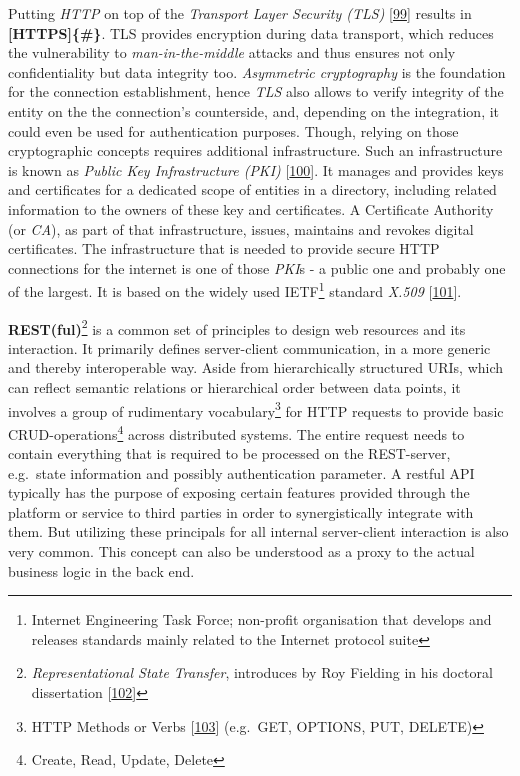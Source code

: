 \documentclass[12pt,english,a4paper,titlepage,cleardoublepage=empty,dottedtoc]{report}
\begin{document}
Putting \emph{HTTP} on top of the \emph{Transport Layer Security (TLS)}
{[}\protect\hyperlink{ref-web_spec_tls}{99}{]} results in
\textbf{{[}HTTPS{]}\{\#\}}. TLS provides encryption during data
transport, which reduces the vulnerability to \emph{man-in-the-middle}
attacks and thus ensures not only confidentiality but data integrity
too. \emph{Asymmetric cryptography} is the foundation for the connection
establishment, hence \emph{TLS} also allows to verify integrity of the
entity on the the connection's counterside, and, depending on the
integration, it could even be used for authentication purposes. Though,
relying on those cryptographic concepts requires additional
infrastructure. Such an infrastructure is known as \emph{Public Key
Infrastructure (PKI)}
{[}\protect\hyperlink{ref-book_2014_chapter-14-5-pki}{100}{]}. It
manages and provides keys and certificates for a dedicated scope of
entities in a directory, including related information to the owners of
these key and certificates. A Certificate Authority (or \emph{CA}), as
part of that infrastructure, issues, maintains and revokes digital
certificates. The infrastructure that is needed to provide secure HTTP
connections for the internet is one of those \emph{PKI}s - a public one
and probably one of the largest. It is based on the widely used
IETF\footnote{Internet Engineering Task Force; non-profit organisation
  that develops and releases standards mainly related to the Internet
  protocol suite} standard \emph{X.509}
{[}\protect\hyperlink{ref-web_spec_x509}{101}{]}.

\textbf{REST(ful)}\footnote{\emph{Representational State Transfer},
  introduces by Roy Fielding in his doctoral dissertation
  {[}\protect\hyperlink{ref-web_spec_rest}{102}{]}} is a common set of
principles to design web resources and its interaction. It primarily
defines server-client communication, in a more generic and thereby
interoperable way. Aside from hierarchically structured URIs, which can
reflect semantic relations or hierarchical order between data points, it
involves a group of rudimentary vocabulary\footnote{HTTP Methods or
  Verbs {[}\protect\hyperlink{ref-web_spec_http-methods}{103}{]}
  (e.g.~GET, OPTIONS, PUT, DELETE)} for HTTP requests to provide basic
CRUD-operations\footnote{Create, Read, Update, Delete} across
distributed systems. The entire request needs to contain everything that
is required to be processed on the REST-server, e.g.~state information
and possibly authentication parameter. A restful API typically has the
purpose of exposing certain features provided through the platform or
service to third parties in order to synergistically integrate with
them. But utilizing these principals for all internal server-client
interaction is also very common. This concept can also be understood as
a proxy to the actual business logic in the back end.
\end{document}
